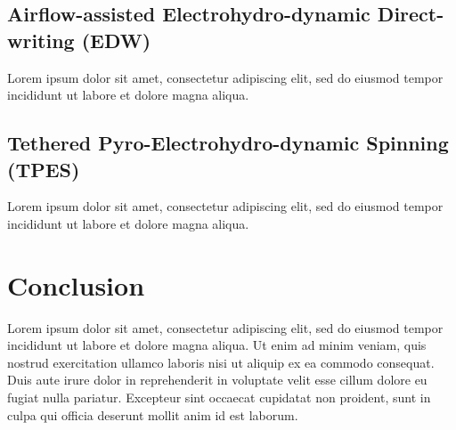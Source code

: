 \documentclass[5p,,preprint,12pt,twocolumn]{elsarticle}
\begin{document}
\subsection{Airflow-assisted Electrohydro-dynamic Direct-writing (EDW) \unskip~\protect\cite{527120:11974312}}Lorem ipsum dolor sit amet, consectetur adipiscing elit, sed do eiusmod tempor incididunt ut labore et dolore magna aliqua.



\subsection{Tethered Pyro-Electrohydro-dynamic Spinning (TPES) \unskip~\protect\cite{527120:11974307}}Lorem ipsum dolor sit amet, consectetur adipiscing elit, sed do eiusmod tempor incididunt ut labore et dolore magna aliqua. 
    
\section{Conclusion}
Lorem ipsum dolor sit amet, consectetur adipiscing elit, sed do eiusmod tempor incididunt ut labore et dolore magna aliqua. Ut enim ad minim veniam, quis nostrud exercitation ullamco laboris nisi ut aliquip ex ea commodo consequat. Duis aute irure dolor in reprehenderit in voluptate velit esse cillum dolore eu fugiat nulla pariatur. Excepteur sint occaecat cupidatat non proident, sunt in culpa qui officia deserunt mollit anim id est laborum.


    






\end{document}
